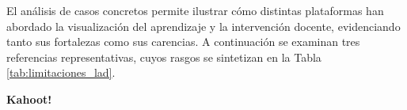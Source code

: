 El análisis de casos concretos permite ilustrar cómo distintas plataformas han abordado la visualización del aprendizaje y la intervención docente, evidenciando tanto sus fortalezas como sus carencias. A continuación se examinan tres referencias representativas, cuyos rasgos se sintetizan en la Tabla \ref{tab:limitaciones_lad}.

\textbf{Kahoot!}

%
%
%

